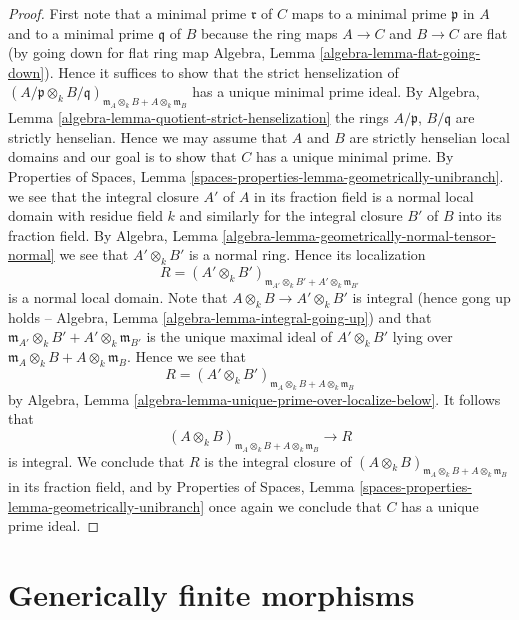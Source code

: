 \begin{proof}
First note that a minimal prime $\mathfrak r$ of $C$ maps to a minimal
prime $\mathfrak p$ in $A$ and to a minimal prime $\mathfrak q$ of $B$
because the ring maps $A \to C$ and $B \to C$ are flat (by going down for
flat ring map
Algebra, Lemma \ref{algebra-lemma-flat-going-down}).
Hence it suffices to show that the strict henselization of
$(A/\mathfrak p \otimes_k B/\mathfrak q)_{
\mathfrak m_A \otimes_k B + A \otimes_k \mathfrak m_B}$
has a unique minimal prime ideal. By
Algebra, Lemma \ref{algebra-lemma-quotient-strict-henselization}
the rings $A/\mathfrak p$, $B/\mathfrak q$ are strictly henselian.
Hence we may assume that $A$ and $B$ are strictly henselian
local domains and our goal is to show that $C$ has a unique minimal prime. By
Properties of Spaces,
Lemma \ref{spaces-properties-lemma-geometrically-unibranch}.
we see that the integral closure $A'$ of $A$ in its fraction field
is a normal local domain with residue field $k$ and similarly for the
integral closure $B'$ of $B$ into its fraction field. By
Algebra, Lemma \ref{algebra-lemma-geometrically-normal-tensor-normal}
we see that $A' \otimes_k B'$ is a normal ring. Hence its localization
$$
R = (A' \otimes_k B')_{
\mathfrak m_{A'} \otimes_k B' + A' \otimes_k \mathfrak m_{B'}}
$$
is a normal local domain. Note that $A \otimes_k B \to A' \otimes_k B'$
is integral (hence gong up holds --
Algebra, Lemma \ref{algebra-lemma-integral-going-up})
and that $\mathfrak m_{A'} \otimes_k B' + A' \otimes_k \mathfrak m_{B'}$
is the unique maximal ideal of $A' \otimes_k B'$
lying over $\mathfrak m_A \otimes_k B + A \otimes_k \mathfrak m_B$.
Hence we see that
$$
R = (A' \otimes_k B')_{
\mathfrak m_A \otimes_k B + A \otimes_k \mathfrak m_B}
$$
by
Algebra, Lemma \ref{algebra-lemma-unique-prime-over-localize-below}.
It follows that
$$
(A \otimes_k B)_{
\mathfrak m_A \otimes_k B + A \otimes_k \mathfrak m_B}
\longrightarrow
R
$$
is integral. We conclude that $R$ is the integral closure of
$(A \otimes_k B)_{
\mathfrak m_A \otimes_k B + A \otimes_k \mathfrak m_B}$
in its fraction field, and by
Properties of Spaces,
Lemma \ref{spaces-properties-lemma-geometrically-unibranch}
once again we conclude that $C$ has a unique prime ideal.
\end{proof}



\section{Generically finite morphisms}
\label{section-generically-finite}

